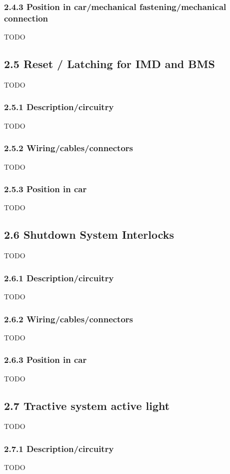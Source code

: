 \documentclass{article}
\begin{document}
\subsubsection*{2.4.3 Position in car/mechanical fastening/mechanical connection}
TODO

\subsection*{2.5 Reset / Latching for IMD and BMS}
TODO

\subsubsection*{2.5.1 Description/circuitry}
TODO

\subsubsection*{2.5.2 Wiring/cables/connectors}
TODO

\subsubsection*{2.5.3 Position in car}
TODO

\subsection*{2.6 Shutdown System Interlocks}
TODO

\subsubsection*{2.6.1 Description/circuitry}
TODO

\subsubsection*{2.6.2 Wiring/cables/connectors}
TODO

\subsubsection*{2.6.3 Position in car}
TODO

\subsection*{2.7 Tractive system active light}
TODO

\subsubsection*{2.7.1 Description/circuitry}
TODO
\end{document}
